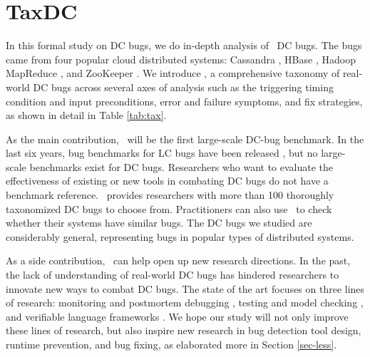 
\section{TaxDC}
\label{sec-taxdc}

In this formal study on DC bugs, we do in-depth analysis of \numDcBugs\ DC
bugs.  The bugs came from four popular cloud distributed systems: Cassandra
\cite{CassandraWeb}, HBase \cite{HBaseWeb}, Hadoop MapReduce \cite{HadoopWeb},
and ZooKeeper \cite{ZooKeeperWeb}.
%
We introduce \taxdc, a comprehensive taxonomy of real-world DC bugs across
several axes of analysis such as the triggering timing condition and input
preconditions, error and failure symptoms, and fix strategies, as shown in
detail in Table \ref{tab:tax}.

As the main contribution, \tdc\ will be the first large-scale DC-bug benchmark.
In the last six years, bug benchmarks for LC bugs have been released
\cite{Jalbert11-RADBench, jieyu}, but no large-scale benchmarks exist for DC
bugs.  Researchers who want to evaluate the effectiveness of existing or new
tools in combating DC bugs do not have a benchmark reference.  \tdc\ provides
researchers with more than 100 thoroughly taxonomized DC bugs to choose from.
Practitioners can also use \tdc\ to check whether their systems have similar
bugs.  The DC bugs we studied are considerably general, representing bugs in
popular types of distributed systems.

As a side contribution, \tdc\ can help open up new research directions. In the
past, the lack of understanding of real-world DC bugs has hindered researchers
to innovate new ways to combat DC bugs.  The state of the art focuses on three
lines of research: monitoring and postmortem debugging \cite{Geels+07-Friday,
Liu+08-D3S, Liu+07-WiDS, Reynolds+06-Pip}, testing and model checking
\cite{Guo+11-Demeter, Killian+07-LifeDeathMaceMC,
Simsa+10-Dbug, Yang+09-Modist}, and verifiable language frameworks
\cite{Desai+13-PLang, Wilcox+15-Verdi}.  We hope our study will not only improve
these lines of research, but also inspire new research in bug detection tool
design, runtime prevention, and bug fixing, as elaborated more in Section
\ref{sec-less}.

